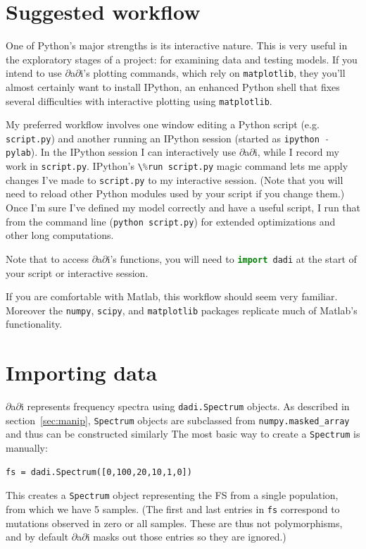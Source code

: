 \documentclass[12pt]{article}
\makeatletter
\newcommand{\dadi}{$\partial$a$\partial$i\xspace}
\newcommand{\py}[1]{\lstinline[language=Python, showstringspaces=False]@#1@}
\makeatother
\begin{document}
\section{Suggested workflow}

One of Python's major strengths is its interactive nature.
This is very useful in the exploratory stages of a project: for examining data and testing models.
If you intend to use \dadi's plotting commands, which rely on \py{matplotlib}, they you'll almost certainly want to install IPython, an enhanced Python shell that fixes several difficulties with interactive plotting using \py{matplotlib}.

My preferred workflow involves one window editing a Python script (e.g. \py{script.py}) and another running an IPython session (started as \py{ipython -pylab}).
In the IPython session I can interactively use \dadi, while I record my work in \py{script.py}.
IPython's \py{\%run script.py} magic command lets me apply changes I've made to \py{script.py} to my interactive session. 
(Note that you will need to reload other Python modules used by your script if you change them.)
Once I'm sure I've defined my model correctly and have a useful script, I run that from the command line (\py{python script.py}) for extended optimizations and other long computations.

Note that to access \dadi's functions, you will need to \py{import dadi} at the start of your script or interactive session.

If you are comfortable with Matlab, this workflow should seem very familiar.
Moreover the \py{numpy}, \py{scipy}, and \py{matplotlib} packages replicate much of Matlab's functionality.

\section{Importing data}

\dadi represents frequency spectra using \py{dadi.Spectrum} objects.
As described in section~\ref{sec:manip}, \py{Spectrum} objects are subclassed from \py{numpy.masked_array} and thus can be constructed similarly
The most basic way to create a \py{Spectrum} is manually:
\begin{lstlisting}
fs = dadi.Spectrum([0,100,20,10,1,0])
\end{lstlisting}
This creates a \py{Spectrum} object representing the FS from a single population, from which we have 5 samples.
(The first and last entries in \py{fs} correspond to mutations observed in zero or all samples. These are thus not polymorphisms, and by default \dadi masks out those entries so they are ignored.)
\end{document}
